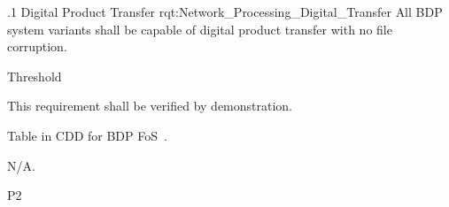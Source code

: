 \ONERQMTVKPP
{\RqtNumberBase.1}
{Digital Product Transfer}
{rqt:Network_Processing_Digital_Transfer}
{All BDP system variants shall be capable of digital product transfer with no file corruption.}%
{
	\item [Phase 1] Threshold
}
{This requirement shall be verified by demonstration.}
{
\item [5.4] Table in CDD for BDP FoS~\cite{ref__BDP_FOS_CDD}.
}
{
  \item N/A.
}
{P2}
